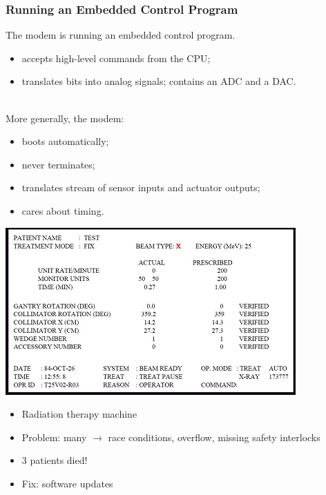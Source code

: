 \begin{frame}
\frametitle{Running an Embedded Control Program}

The modem is running an \alert{embedded control program}.
\begin{itemize}
\item accepts high-level commands from the CPU;
\item translates bits into analog signals; contains an ADC and a DAC.
\end{itemize}

~\\[1em]More generally, the modem:
\begin{itemize}
\item boots automatically;
\item never terminates;
\item translates stream of sensor inputs and actuator outputs;
\item cares about timing.
\end{itemize}
\end{frame}

\begin{multiframe}[Therac-25]
  \begin{center}
    \includegraphics[width=.8\linewidth]{images/Xraybad}
  \end{center}

\end{multiframe} \begin{multiframe}

  \begin{itemize}
  \item Radiation therapy machine
  \item Problem: \alert{many} $\rightarrow$ race conditions, overflow,
    missing safety interlocks
  \item 3 patients died!
  \item Fix: software updates
  \end{itemize}



\end{multiframe}

